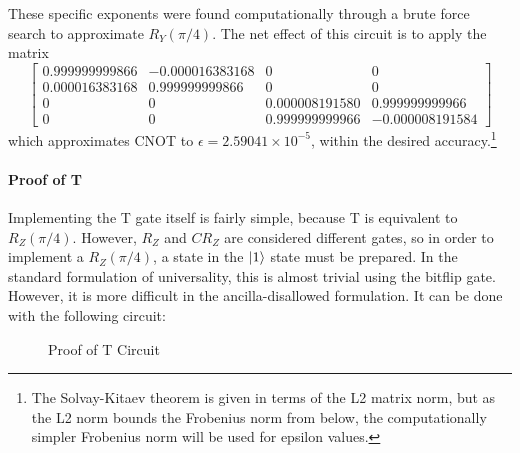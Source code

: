 \documentclass[12pt]{article}
\begin{document}
These specific exponents were found computationally through a brute force search to approximate $R_Y(\pi / 4)$. The net effect of this circuit is to apply the matrix
$$
\begin{bmatrix}
    0.999999999866&-0.000016383168&0&0\\
    0.000016383168& 0.999999999866&0&0\\
    0&0&0.000008191580& 0.999999999966\\
    0&0&0.999999999966&-0.000008191584
\end{bmatrix}
$$
which approximates CNOT to $\epsilon = 2.59041 \times 10^{-5}$, within the desired accuracy.\footnote{The Solvay-Kitaev theorem is given in terms of the L2 matrix norm, but as the L2 norm bounds the Frobenius norm from below, the computationally simpler Frobenius norm will be used for epsilon values.}

\paragraph{Proof of T}
Implementing the T gate itself is fairly simple, because T is equivalent to $R_Z(\pi/4)$. However, $R_Z$ and $CR_Z$ are considered different gates, so in order to implement a $R_Z(\pi/4)$, a state in the $\ket{1}$ state must be prepared. In the standard formulation of universality, this is almost trivial using the bitflip gate. However, it is more difficult in the ancilla-disallowed formulation. It can be done with the following circuit:
\begin{figure}[h]
    \centering
    \caption{Proof of T Circuit}
    \label{fig:quantum universal set 1 proof of T circuit}
\end{figure}
\end{document}

